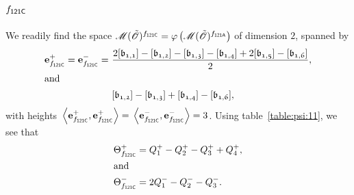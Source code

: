 \subsection{$f_\mathsf{{121C}}$}
We readily find the space $\operatorname{{\mathscr M}}({\tilde{{\mathscr{O}}}})^{f_\mathsf{{121C}}}
={\varphi}\left(\operatorname{{\mathscr M}}({\tilde{{\mathscr{O}}}})^{f_\mathsf{{121A}}}\right)$
of dimension $2$, spanned by
\begin{align*}
  \e{\mf{121C}}^+ = \e{\mf{121C}}^- = &\ \frac{2\cls{b_{1,1}}-\cls{b_{1,2}}-\cls{b_{1,3}}-\cls{b_{1,4}}+2\cls{b_{1,5}}-\cls{b_{1,6}}}{2},\\
\intertext{and}
  &\ \cls{b_{1,2}}-\cls{b_{1,3}}+\cls{b_{1,4}}-\cls{b_{1,6}},\\
\end{align*}
with heights $\,\<\e{\mf{121C}}^+,\e{\mf{121C}}^+>=\,\<\e{\mf{121C}}^-,\e{\mf{121C}}^->=3$.
Using table~\ref{table:psi:11},
we see that
\begin{align*}
  {\Theta}^+_{f_\mathsf{{121C}}} & =  Q_{1}^{+} - Q_{2}^{+} - Q_{3}^{+} + Q_{4}^{+}, \\
\intertext{and}
  {\Theta}^-_{f_\mathsf{{121C}}} & =  2Q_{1}^{-} - Q_{2}^{-} - Q_{3}^{-}. \\
\end{align*}
